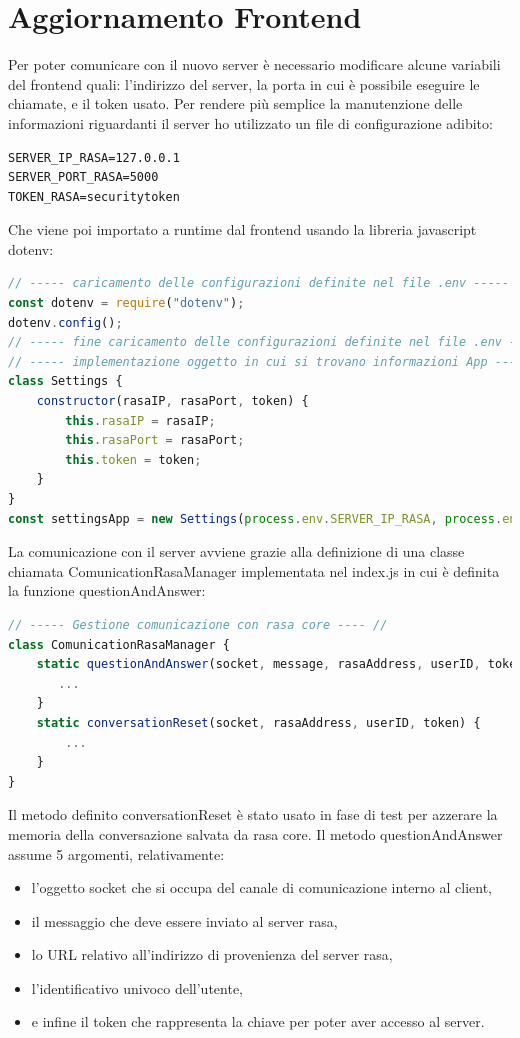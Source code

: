 \section{Aggiornamento Frontend}
Per poter comunicare con il nuovo server è necessario modificare alcune variabili del frontend quali: l'indirizzo del server, la porta in cui è possibile eseguire le chiamate, e il token usato.
Per rendere più semplice la manutenzione delle informazioni riguardanti il server ho utilizzato un file di configurazione adibito:
\begin{lstlisting}
SERVER_IP_RASA=127.0.0.1
SERVER_PORT_RASA=5000
TOKEN_RASA=securitytoken
\end{lstlisting}
Che viene poi importato a runtime dal frontend usando la libreria javascript dotenv:
\begin{lstlisting}[language=JavaScript]
// ----- caricamento delle configurazioni definite nel file .env ----- //
const dotenv = require("dotenv");
dotenv.config();
// ----- fine caricamento delle configurazioni definite nel file .env ----- //
// ----- implementazione oggetto in cui si trovano informazioni App ----- //
class Settings {
    constructor(rasaIP, rasaPort, token) {
        this.rasaIP = rasaIP;
        this.rasaPort = rasaPort;
        this.token = token;
    }
}
const settingsApp = new Settings(process.env.SERVER_IP_RASA, process.env.SERVER_PORT_RASA, process.env.TOKEN_RASA);
\end{lstlisting}
La comunicazione con il server avviene grazie alla definizione di una classe chiamata ComunicationRasaManager implementata nel index.js in cui è definita la funzione questionAndAnswer:
\begin{lstlisting}[language=JavaScript]
// ----- Gestione comunicazione con rasa core ---- //
class ComunicationRasaManager {
    static questionAndAnswer(socket, message, rasaAddress, userID, token) {
       ...
    }
    static conversationReset(socket, rasaAddress, userID, token) {
        ...
    }
}
\end{lstlisting}
Il metodo definito conversationReset è stato usato in fase di test per azzerare la memoria della conversazione salvata da rasa core.
Il metodo questionAndAnswer assume 5 argomenti, relativamente:
\begin{itemize}
\item l'oggetto socket che si occupa del canale di comunicazione interno al client,
\item il messaggio che deve essere inviato al server rasa,
\item lo URL relativo all'indirizzo di provenienza del server rasa,
\item l'identificativo univoco dell'utente,
\item e infine il token che rappresenta la chiave per poter aver accesso al server.
\end{itemize}
